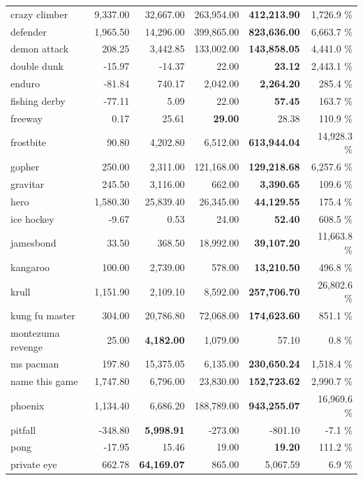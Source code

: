 \documentclass{article}
\begin{document}
\begin{table}
\begin{center}
\begin{tabularx}{0.750000\textwidth}{X| r r r r r}
crazy climber &9,337.00 & 32,667.00 & 263,954.00 & \textbf{412,213.90} & 1,726.9 \%\\
defender &1,965.50 & 14,296.00 & 399,865.00 & \textbf{823,636.00} & 6,663.7 \%\\
demon attack &208.25 & 3,442.85 & 133,002.00 & \textbf{143,858.05} & 4,441.0 \%\\
double dunk &-15.97 & -14.37 & 22.00 & \textbf{23.12} & 2,443.1 \%\\
enduro &-81.84 & 740.17 & 2,042.00 & \textbf{2,264.20} & 285.4 \%\\
fishing derby &-77.11 & 5.09 & 22.00 & \textbf{57.45} & 163.7 \%\\
freeway &0.17 & 25.61 & \textbf{29.00} & 28.38 & 110.9 \%\\
frostbite &90.80 & 4,202.80 & 6,512.00 & \textbf{613,944.04} & 14,928.3 \%\\
gopher &250.00 & 2,311.00 & 121,168.00 & \textbf{129,218.68} & 6,257.6 \%\\
gravitar &245.50 & 3,116.00 & 662.00 & \textbf{3,390.65} & 109.6 \%\\
hero &1,580.30 & 25,839.40 & 26,345.00 & \textbf{44,129.55} & 175.4 \%\\
ice hockey &-9.67 & 0.53 & 24.00 & \textbf{52.40} & 608.5 \%\\
jamesbond &33.50 & 368.50 & 18,992.00 & \textbf{39,107.20} & 11,663.8 \%\\
kangaroo &100.00 & 2,739.00 & 578.00 & \textbf{13,210.50} & 496.8 \%\\
krull &1,151.90 & 2,109.10 & 8,592.00 & \textbf{257,706.70} & 26,802.6 \%\\
kung fu master &304.00 & 20,786.80 & 72,068.00 & \textbf{174,623.60} & 851.1 \%\\
montezuma revenge &25.00 & \textbf{4,182.00} & 1,079.00 & 57.10 & 0.8 \%\\
ms pacman &197.80 & 15,375.05 & 6,135.00 & \textbf{230,650.24} & 1,518.4 \%\\
name this game &1,747.80 & 6,796.00 & 23,830.00 & \textbf{152,723.62} & 2,990.7 \%\\
phoenix &1,134.40 & 6,686.20 & 188,789.00 & \textbf{943,255.07} & 16,969.6 \%\\
pitfall &-348.80 & \textbf{5,998.91} & -273.00 & -801.10 & -7.1 \%\\
pong &-17.95 & 15.46 & 19.00 & \textbf{19.20} & 111.2 \%\\
private eye &662.78 & \textbf{64,169.07} & 865.00 & 5,067.59 & 6.9 \%\\

\end{tabularx}
\end{center}
\end{table}
\end{document}
